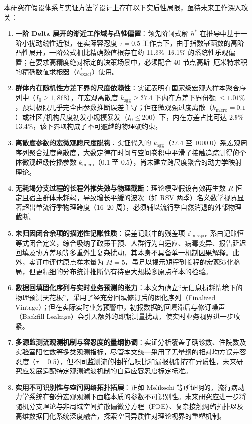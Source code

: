 \documentclass[11pt,a4paper]{article}
\theoremstyle{plain}
\theoremstyle{definition}
\begin{document}
本研究在假设体系与实证方法学设计上存在以下实质性局限，亟待未来工作深入攻关：
\begin{enumerate}
\item \textbf{一阶 Delta 展开的渐近工作域与凸性偏置}：领先阶闭式解 $h^*$ 在推导中基于一阶小扰动线性近似，在实际容忍度 $\tau = 0.5$ 工作点下，由于指数幂函数的高阶凸性展开，一阶公式相比精确数值根存在约 11.8\%--16.1\% 的系统性乐观偏置；在要求高精度绝对标定的决策场景中，必须配合 40 节点高斯--厄米特求积的精确数值求根器（$h^*_{\text{exact}}$）使用。
\item \textbf{群体内在随机性方差下界的尺度依赖性}：实证表明在国家级宏观大样本聚合序列中（$I_0 \ge 1,868$），在宏观离散度 $k_{\text{agg}} \ge 27.4$ 下内在方差下界份额 $\le 1.01\%$，预测极限几乎完全由参数推断误差主导；但在微观强过度离散（$k_{\text{micro}}=0.1$）或社区/机构尺度初发小规模暴发（$I_0 \le 200$）下，内在方差占比可达 2.9\%--13.4\%，该下界项构成了不可逾越的物理硬约束。
\item \textbf{离散度参数的宏微观跨尺度脱钩}：实证代入的 $k_{\text{agg}}$（27.4 至 1000.0）系宏观周序列聚合过度离散度，大数定律在时间与空间卷积中平滑了接触追踪测得的个体微观超级传播参数 $k_{\text{micro}}$（0.1 至 0.5），尚未建立跨尺度聚合的动力学映射理论。
\item \textbf{无耗竭分支过程的长程外推失效与物理截断}：理论模型假设有效再生数 $R$ 恒定且宿主群体未耗竭，导致增长平缓的波次（如 RSV 两季）名义数学视界显著超出单流行季物理跨度（16--20 周），必须辅以流行季自然消退的外部物理截断。
\item \textbf{未归因闭合余项的描述性记账性质}：误差记账中的残差项 $\mathcal{E}_{\text{misspec}}$ 系由记账恒等式闭合定义，综合吸纳了政策干预、人群行为自适应、病毒变异、报告延迟回填及协方差项等多重外生复杂扰动，其本身不具备单一机制因果解释。此外，实证中评估原点样本量为 $M = 5$，虽足以揭示短程到长程的宏观演化格局，但更精细的分布统计推断仍有待更大规模多原点样本的检验。
\item \textbf{数据回填固化序列与实时业务预测的张力}：本文为确立“无信息损耗情境下的物理预测天花板”，采用了经充分回填修订后的固化序列（Finalized Vintage）；但在实际实时业务预警中，初报数据的回填滞后与修订噪声（Backfill Leakage）会引入额外的即期测量扰动，使实时业务视界进一步收紧。
\item \textbf{多源监测流观测机制与容忍度的量纲协调}：实证分析覆盖了确诊数、住院数及实验室阳性数等多类观测指标，尽管本文统一采用了无量纲的相对均方误差容忍度（$\tau = 0.5$），但不同监测流的抽样信噪比和漏报机制存在异质性，未来研究应发展适配特定观测滤波机制的自适应容忍度标定标准。
\item \textbf{实用不可识别性与空间网络拓扑拓展}：正如 Melikechi 等\citep{melikechi2022limits}所证明的，流行病动力学系统在部分宏观观测下面临本质的参数不可识别性。未来研究应进一步将随机分支理论与非局域空间扩散偏微分方程（PDE）、复杂接触网络拓扑以及高维数据同化系统深度融合，探索空间异质性对理论视界的重塑机制。

\end{enumerate}
\end{document}
